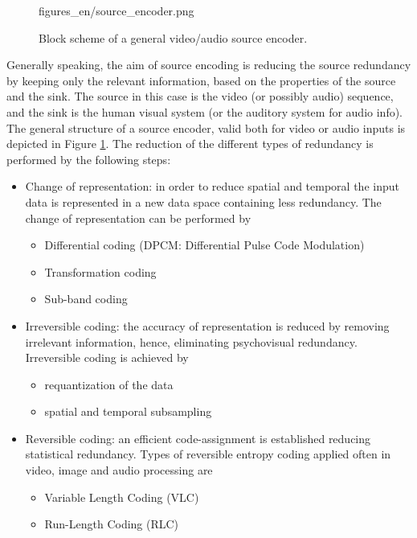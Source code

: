 %

\begin{figure}[]
	\centering
	\begin{overpic}[width = 0.8\columnwidth ]{figures_en/source_encoder.png}
	\end{overpic}
	\caption{Block scheme of a general video/audio source encoder.}
	\label{Fig:source_encoder}
\end{figure}
Generally speaking, the aim of source encoding is reducing the source redundancy by keeping only the relevant information, based on the properties of the source and the sink.
The source in this case is the video (or possibly audio) sequence, and the sink is the human visual system (or the auditory system for audio info).
The general structure of a source encoder, valid both for video or audio inputs is depicted in Figure \ref{Fig:source_encoder}.
The reduction of the different types of redundancy is performed by the following steps:
\begin{itemize}
\item Change of representation: in order to reduce spatial and temporal the input data is represented in a new data space containing less redundancy.
The change of representation can be performed by 
	\begin{itemize}
	\item Differential coding (DPCM: Differential Pulse Code Modulation)
	\item Transformation coding
	\item Sub-band coding
	\end{itemize}
\item Irreversible coding: the accuracy of representation is reduced by removing irrelevant information, hence, eliminating psychovisual redundancy.
Irreversible coding is achieved by 
	\begin{itemize}
	\item requantization of the data
	\item spatial and temporal subsampling
	\end{itemize}
\item Reversible coding: an efficient code-assignment is established reducing statistical redundancy.
Types of reversible entropy coding applied often in video, image and audio processing are
	\begin{itemize}
	\item Variable Length Coding (VLC)
	\item Run-Length Coding (RLC)
	\end{itemize}
\end{itemize}

